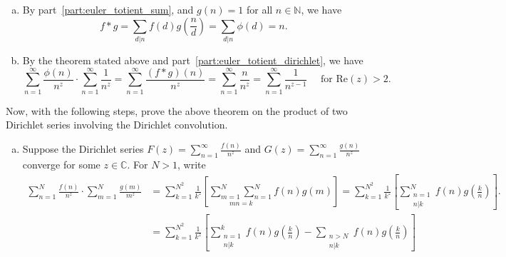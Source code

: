\documentclass{elegantbook}
\begin{document}
\begin{problemset}[Exercises]
\begin{solution}
\begin{enumerate}[(a)]
\[\begin{aligned}
        &= \sum_{\beta_1=0}^{\alpha_1} p_1^{\beta_1} \left(1 - \frac{1}{p_1}\right) \sum_{\beta_2=0}^{\alpha_2} p_2^{\beta_2} \left(1 - \frac{1}{p_2}\right) \cdots \sum_{\beta_r=0}^{\alpha_r} p_r^{\beta_r} \left(1 - \frac{1}{p_r}\right) \\
        &= \left(1 - \frac{1}{p_1}\right) \left( \frac{p_1^{\alpha_1 + 1} - 1}{p_1 - 1} \right) \left(1 - \frac{1}{p_2}\right) \left( \frac{p_2^{\alpha_2 + 1} - 1}{p_2 - 1} \right) \cdots \left(1 - \frac{1}{p_r}\right) \left( \frac{p_r^{\alpha_r + 1} - 1}{p_r - 1} \right) \\
        &= p_1^{\alpha_1} p_2^{\alpha_2} \cdots p_r^{\alpha_r} = n.
      \end{aligned}
      \]  
      \item By part~\ref{part:euler_totient_sum}, and $g(n) = 1$ for all $n \in \mathbb{N}$, we have
      \[
        f * g = \sum_{d|n} f(d) g\left(\frac{n}{d}\right) = \sum_{d|n} \phi(d) = n.
      \]
      \item By the theorem stated above and part~\ref{part:euler_totient_dirichlet}, we have
      \[
        \sum_{n=1}^{\infty} \frac{\phi(n)}{n^z} \cdot \sum_{n=1}^{\infty} \frac{1}{n^z} = \sum_{n=1}^{\infty} \frac{(f * g)(n)}{n^z} = \sum_{n=1}^{\infty} \frac{n}{n^z} = \sum_{n=1}^{\infty} \frac{1}{n^{z-1}} \quad \text{ for } \mathrm{Re}(z)>2.
      \]
    \end{enumerate}
  \end{solution}
  \item \label{ex:dirichlet_series_convolution_proof}
  Now, with the following steps, prove the above theorem on the product of two Dirichlet series involving the Dirichlet convolution.
  \begin{enumerate}[(a)]
    \item Suppose the Dirichlet series $F(z)=\sum_{n=1}^{\infty} \frac{f(n)}{n^z}$ and $G(z)=\sum_{n=1}^{\infty} \frac{g(n)}{n^z}$ converge for some $z \in \mathbb{C}$. For $N>1$, write
    \begin{align*}
      \sum^N_{n=1} \frac{f(n)}{n^z} \cdot \sum^N_{m=1} \frac{g(m)}{m^z} &= \sum_{k=1}^{N^2} \frac{1}{k^z}\left[ \underset{mn=k}{\sum_{m=1}^N\sum_{n=1}^N} f(n) g(m) \right] = \sum_{k=1}^{N^2} \frac{1}{k^z} \left[ \sum_{\substack{n= 1 \\ n|k}}^{N} f(n) g\left(\frac{k}{n}\right) \right]. \\
      &=\sum_{k=1}^{N^2} \frac{1}{k^z} \left[ \sum_{\substack{n= 1 \\ n|k}}^{k} f(n) g\left(\frac{k}{n}\right) - \sum_{\substack{n>N \\ n|k}} f(n) g\left(\frac{k}{n}\right) \right] \\

\end{align*}
\end{enumerate}
\end{problemset}
\end{document}

